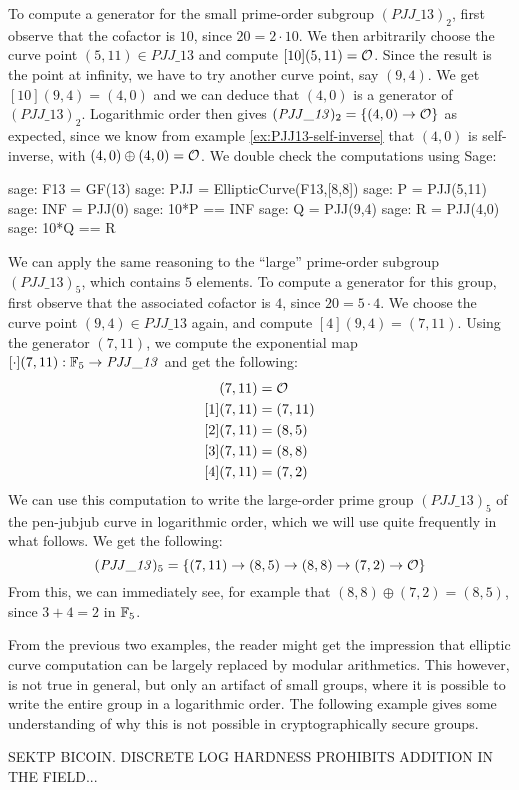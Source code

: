 \begin{example}
To compute a generator for the small prime-order subgroup $(\mathit{PJJ\_13})_2$, first observe that the cofactor is $10$, since $20=2\cdot 10$. We then arbitrarily choose the curve point $(5,11)\in \mathit{PJJ\_13}$ and compute $[10](5,11)=\mathcal{O}$. Since the result is the point at infinity, we have to try another curve point, say $(9,4)$. We get $[10](9,4)=(4,0)$ and we can deduce that $(4,0)$ is a generator of $(\mathit{PJJ\_13})_2$. Logarithmic order then gives
$(\mathit{PJJ\_13})_2 = \{(4,0)\to \mathcal{O}\}$
as expected, since we know from example \ref{ex:PJJ13-self-inverse} that $(4,0)$ is self-inverse, with $(4,0)\oplus (4,0)=\mathcal{O}$. We double check the computations using Sage: 
\begin{sagecommandline}
sage: F13 = GF(13)
sage: PJJ = EllipticCurve(F13,[8,8])
sage: P = PJJ(5,11)
sage: INF = PJJ(0)
sage: 10*P == INF
sage: Q = PJJ(9,4)
sage: R = PJJ(4,0)
sage: 10*Q == R
\end{sagecommandline}
We can apply the same reasoning to the ``large'' prime-order subgroup $(\mathit{PJJ\_13})_5$, which contains $5$ elements. To compute a generator for this group, first observe that the associated cofactor is $4$, since $20=5\cdot 4$. We choose the curve point $(9,4)\in \mathit{PJJ\_13}$ again, and compute $[4](9,4)=(7,11)$.  Using the generator $(7,11)$, we compute the exponential map $[\cdot](7,11): \mathbb{F}_5 \to \mathit{PJJ\_13}$ and get the following:
\begin{align*}
[0](7,11) &= \Oinf\\
[1](7,11) &= (7,11)\\
[2](7,11) &= (8,5)\\
[3](7,11) &= (8,8)\\
[4](7,11) &= (7,2)
\end{align*}
We can use this computation to write the large-order prime group $(\mathit{PJJ\_13})_5$ of the pen-jubjub curve in logarithmic order, which we will use quite frequently in what follows. We get the following:
\begin{equation}\label{eq:PJJ13-logarithmic-order}
(\mathit{PJJ\_13})_5 = \{(7,11)\to(8,5)\to(8,8)\to(7,2)\to \mathcal{O}\}
\end{equation}
From this, we can immediately see, for example that  $(8,8)\oplus (7,2)= (8,5)$, since 
$3+4=2$ in $\mathbb{F}_5$.
\end{example}
From the previous two examples, the reader might get the impression that elliptic curve computation can be largely replaced by modular arithmetics. This however, is not true in general, but only an artifact of small groups, where it is possible to write the entire group in a logarithmic order. The following example gives some understanding of why this is not possible in cryptographically secure groups.
\begin{example}
SEKTP BICOIN. DISCRETE LOG HARDNESS PROHIBITS ADDITION IN THE FIELD...
\end{example}
